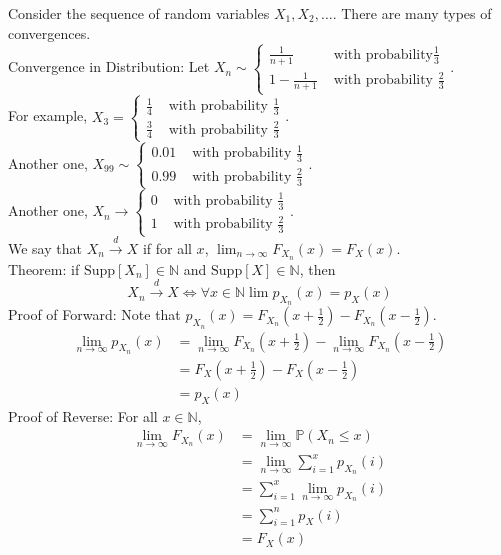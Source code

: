 \documentclass[12pt]{article}
\newcommand{\prob}[1]{\mathbb{P}(#1)}
\newcommand{\supp}[1]{\text{Supp}[ #1 ]}
\begin{document}
 Consider the sequence of random variables $X_1, X_2, \dots$. There are many types of convergences. \\ 
 Convergence in Distribution: Let $X_n \sim \begin{cases} \frac{1}{n+1} &\text{ with probability} \frac{1}{3} \\ 1 - \frac{1}{n+1} &\text{ with probability } \frac{2}{3} \end{cases} $. \\
 For example, $X_3 = \begin{cases} \frac{1}{4} &\text{ with probability } \frac{1}{3} \\ \frac{3}{4} &\text{ with probability } \frac{2}{3} \end{cases} $. \\
 Another one, $X_{99} \sim \begin{cases} 0.01 &\text{ with probability } \frac{1}{3} \\ 0.99 &\text{ with probability } \frac{2}{3} \end{cases} $. \\
 Another one, $X_n \to \begin{cases} 0 &\text{ with probability } \frac{1}{3} \\ 1 &\text{ with probability } \frac{2}{3} \end{cases} $. \\
 We say that $X_n \stackrel{d}{\to} X$ if for all $x$, $\lim_{n \to \infty} F_{X_n}(x) = F_X(x) $. 
 \\ Theorem: if $\supp{X_n} \in \mathbb{N}$ and $\supp{X} \in \mathbb{N}$, then 
 $$ X_n \stackrel{d}{\to} X \iff \forall x \in \mathbb{N} \lim p_{X_n}(x) = p_X(x) $$ 
 Proof of Forward: Note that $p_{X_n}(x) = F_{X_n}(x + \frac{1}{2}) - F_{X_n}(x - \frac{1}{2})$. $$ \begin{aligned} \lim_{n \to \infty} p_{X_n}(x) &= \lim_{n \to \infty} F_{X_n}(x + \frac{1}{2}) - \lim_{n \to \infty} F_{X_n}(x - \frac{1}{2}) \\ &= F_X(x + \frac{1}{2}) - F_X(x - \frac{1}{2}) \\ &= p_X(x) \end{aligned} $$ 
 Proof of Reverse: For all $x \in \mathbb{N}$, $$ \begin{aligned} 
 \lim_{n \to \infty} F_{X_n}(x) &= \lim_{n \to \infty} \prob{X_n \leq x} \\ &= \lim_{n \to \infty} \sum_{i=1}^x p_{X_n}(i) \\ &= \sum_{i=1}^x \lim_{n \to \infty} p_{X_n}(i) \\ &= \sum_{i=1}^n p_X(i) \\ &= F_X(x) \end{aligned} $$ 
\end{document}
